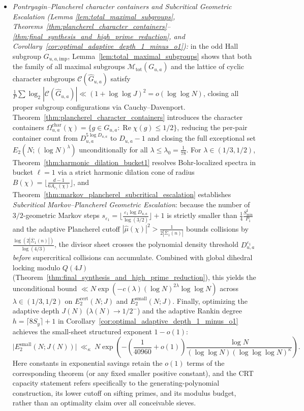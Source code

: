 \documentclass[11pt, a4paper]{article}
\theoremstyle{plain}
\theoremstyle{definition}
\begin{document}
\begin{itemize}
    \item \emph{Pontryagin--Plancherel character containers and Subcritical Geometric Escalation (Lemma \ref{lem:total_maximal_subgroups}, Theo\-rems~\ref{thm:plancherel_character_containers}--\ref{thm:final_synthesis_and_high_prime_reduction}, and Corollary~\ref{cor:optimal_adaptive_depth_1_minus_o1}):} in the odd Hall subgroup $G_{u,a,\mathrm{imp}}$, Lemma~\ref{lem:total_maximal_subgroups} shows that both the family of all maximal subgroups $\mathcal{M}_{\mathrm{tot}}(G_{u,a})$ and the lattice of cyclic character subgroups $\mathcal{C}(\widehat{G}_{u,a})$ satisfy $\frac1P\sum\log_2|\mathcal{C}(\widehat{G}_{u,a})|\ll(1+\log\log J)^{2}=o(\log\log N)$, closing all proper subgroup configurations via Cauchy--Davenport. Theorem~\ref{thm:plancherel_character_containers} introduces the character containers $\Omega_{u,a}^{\mathrm{char}}(\chi)=\{g\in G_{u,a}:\operatorname{Re}\chi(g)\le 1/2\}$, reducing the per-pair container count from $D_{u,a}^{5\log D_{u,a}}$ to $D_{u,a}-1$ and closing the full exceptional set $E_2(N;(\log N)^{\lambda})$ unconditionally for all $\lambda\le\lambda_0=\frac{1}{78}$. For $\lambda\in(1/3,1/2)$, Theorem~\ref{thm:harmonic_dilation_bucket1} resolves Bohr-localized spectra in bucket $\ell=1$ via a strict harmonic dilation cone of radius $B(\chi)=\lfloor\frac{d-1}{6A_{r_1}(\chi)}\rfloor$, and Theorem~\ref{thm:markov_plancherel_subcritical_escalation} establishes \emph{Subcritical Markov--Plancherel Geometric Escalation}: because the number of $3/2$-geometric Markov steps $s_{\varepsilon_1}=\lfloor\frac{\varepsilon_1\log D_{u,a}}{\log(3/2)}\rfloor+1$ is strictly smaller than $\frac14\frac{S_{\min}^{\mathrm{I}}}{P_1}$ and the adaptive Plancherel cutoff $|\widehat{\mu}(\chi)|^{2}>\frac{1}{2|\overline{\Sigma}_1(n)|}$ bounds collisions by $\frac{\log(2|\overline{\Sigma}_1(n)|)}{\log(4/3)}$, the divisor sheet crosses the polynomial density threshold $D_{u,a}^{\varepsilon_1}$ \emph{before} supercritical collisions can accumulate. Combined with global dihedral locking modulo $Q(4J)$ (Theorem~\ref{thm:final_synthesis_and_high_prime_reduction}), this yields the unconditional bound $\ll N\exp(-c(\lambda)(\log N)^{2\lambda}\log\log N)$ across $\lambda\in(1/3,1/2)$ on $E_2^{\mathrm{cert}}(N;J)$ and $E_2^{\mathrm{small}}(N;J)$. Finally, optimizing the adaptive depth $J(N)$ ($\lambda(N)\to 1/2^{-}$) and the adaptive Rankin degree $h=\lceil 8S_y\rceil+1$ in Corollary~\ref{cor:optimal_adaptive_depth_1_minus_o1} achieves the small-sheet structured exponent $1-o(1)$:
    \[
    \big|E_2^{\mathrm{small}}(N;J(N))\big|\ \ll_\kappa\ N\exp\!\left(-\left(\frac{1}{40960}+o(1)\right)\frac{\log N}{(\log\log N)(\log\log\log N)^{\kappa}}\right).
    \]
    Here constants in exponential savings retain the $o(1)$ terms of the corresponding theorem (or any fixed smaller positive constant), and the CRT capacity statement refers specifically to the generating-polynomial construction, its lower cutoff on sifting primes, and its modulus budget, rather than an optimality claim over all conceivable sieves.
\end{itemize}
\end{document}
